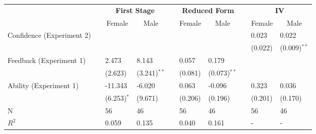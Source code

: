 %
\begin{tabular*}{\textwidth}{@{\extracolsep{\fill}}lcllcllcll}\hline\hline
\multicolumn{1}{c}{\bfseries }&
\multicolumn{1}{c}{\bfseries }&
\multicolumn{2}{c}{\bfseries First Stage}&
\multicolumn{1}{c}{\bfseries }&
\multicolumn{2}{c}{\bfseries Reduced Form}&
\multicolumn{1}{c}{\bfseries }&
\multicolumn{2}{c}{\bfseries IV}
\tabularnewline \cline{1-10}
\multicolumn{1}{l}{}&\multicolumn{1}{c}{}&\multicolumn{1}{c}{Female}&\multicolumn{1}{c}{Male}&\multicolumn{1}{c}{}&\multicolumn{1}{c}{Female}&\multicolumn{1}{c}{Male}&\multicolumn{1}{c}{}&\multicolumn{1}{c}{Female}&\multicolumn{1}{c}{Male}\tabularnewline
\hline
Confidence (Experiment 2)&&&&&&&&0.023&0.022\tabularnewline
&&&&&&&&{\scriptsize (0.022)$^{}$}&{\scriptsize (0.009)$^{**}$}\tabularnewline
Feedback (Experiment 1)&&2.473&8.143&&0.057&0.179&&&\tabularnewline
&&{\scriptsize (2.623)$^{}$}&{\scriptsize (3.241)$^{**}$}&&{\scriptsize (0.081)$^{}$}&{\scriptsize (0.073)$^{**}$}&&&\tabularnewline
Ability (Experiment 1)&&-11.343&-6.020&&0.063&-0.096&&0.323&0.036\tabularnewline
&&{\scriptsize (6.253)$^{*}$}&{\scriptsize (9.671)$^{}$}&&{\scriptsize (0.206)$^{}$}&{\scriptsize (0.196)$^{}$}&&{\scriptsize (0.201)$^{}$}&{\scriptsize (0.170)$^{}$}\tabularnewline
N&&56&46&&56&46&&56&46\tabularnewline
$R^2$&&0.059&0.135&&0.040&0.161&&-&-\tabularnewline
\hline
\end{tabular*}

